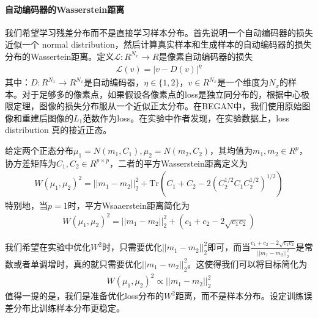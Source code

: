             \paragraph{自动编码器的Wasserstein距离}我们希望学习残差分布而不是直接学习样本分布。首先说明一个自动编码器的损失近似一个 normal distribution，然后计算真实样本和生成样本的自动编码器的损失分布的Wassertein距离。定义$\mathcal{L}:R^{N_x}\to R$是像素自动编码器的损失
            \begin{align*}
            \mathcal{L}(v) =|v-D(v)|^\eta
            \end{align*}
            其中：$D:R^{N_x}\to R^{N_x}$是自动编码器，$\eta\in \{1,2\}$，$v\in  R^{N_x}$是一个维度为$N_x$的样本。对于足够多的像素点，如果假设各像素点的loss是独立同分布的，根据中心极限定理，图像的损失分布服从一个近似正太分布。在BEGAN中，我们使用原始图像和重建后图像的$L_1$范数作为loss。在实验中作者发现，在实验数据上，loss distribution 真的接近正态。
            \par
            给定两个正态分布$\mu_1 = N(m_1,C_1),\mu_2 = N(m_2,C_2)$，其均值为$m_1,m_2\in R^p$，协方差矩阵为$C_1,C_2\in R^{p\times p}$，二者的平方Wasserstein距离定义为
            \begin{align*}
            W(\mu_1,\mu_2)^2 = ||m_1-m_2||_2^2 + \mathrm{Tr}(C_1+C_2-2(C_2^{1/2}C_1C_2^{1/2})^{1/2})
            \end{align*}
            特别地，当$p=1$时，平方Wsaaerstein距离简化为
            \begin{align*}
            W(\mu_1,\mu_2)^2 = ||m_1-m_2||_2^2 +(c_1+c_2-2\sqrt{c_1c_2})
            \end{align*}
            \par
            我们希望在实验中优化$W^2$时，只需要优化$||m_1-m_2||_2^2$即可，而当$\frac{c_1+c_2-2\sqrt{c_1c_2}}{||m_1-m_2||_2^2}$是常数或者单调增时，真的就只需要优化$||m_1-m_2||_2^2$。这使得我们可以将目标简化为
            \begin{align*}
            W(\mu_1,\mu_2)^2 \propto ||m_1-m_2||_2^2
            \end{align*}
            值得一提的是，我们是准备优化loss分布的$W^2$距离，而不是样本分布。设定训练误差分布比训练样本分布更稳定。
